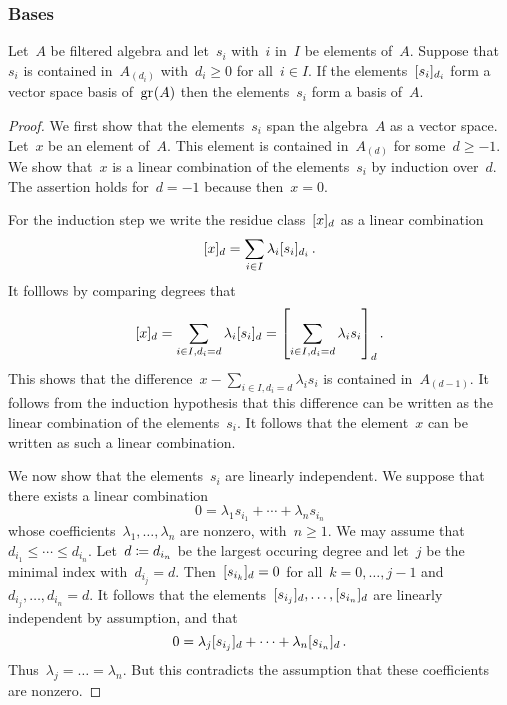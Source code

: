 \subsubsection{Bases}

\begin{proposition}
  \label{checking basis via associated graded}
  Let~$A$ be filtered algebra and let~$s_i$ with~$i$ in~$I$ be elements of~$A$.
  Suppose that~$s_i$ is contained in~$A_{(d_i)}$ with~$d_i \geq 0$ for all~$i \in I$.
  If the elements~$\lbrack s_i \rbrack_{d_i}$ form a vector space basis of~$\gr(A)$ then the elements~$s_i$ form a basis of~$A$.
\end{proposition}


\begin{proof}
  We first show that the elements~$s_i$ span the algebra~$A$ as a vector space.
  Let~$x$ be an element of~$A$.
  This element is contained in~$A_{(d)}$ for some~$d \geq -1$.
  We show that~$x$ is a linear combination of the elements~$s_i$ by induction over~$d$.
  The assertion holds for~$d = -1$ because then~$x = 0$.

  For the induction step we write the residue class~$\lbrack x \rbrack_d$ as a linear combination
  \[
    \lbrack x \rbrack_d
    =
    \sum_{i \in I}
    \lambda_i \lbrack s_i \rbrack_{d_i} \,.
  \]
  It folllows by comparing degrees that
  \[
    \fclass{ x }_d
    =
    \sum_{i \in I, d_i = d}
    \lambda_i \fclass{ s_i }_d
    =
    \fclass*{
      \sum_{i \in I, d_i = d}
      \lambda_i s_i
    }_d \,.
  \]
  This shows that the difference~$x - \sum_{i \in I, d_i = d} \lambda_i s_i$ is contained in~$A_{(d-1)}$.
  It follows from the induction hypothesis that this difference can be written as the linear combination of the elements~$s_i$.
  It follows that the element~$x$ can be written as such a linear combination.

  We now show that the elements~$s_i$ are linearly independent.
  We suppose that there exists a linear combination
  \[
    0
    =
    \lambda_1 s_{i_1} + \dotsb + \lambda_n s_{i_n}
  \]
  whose coefficients~$\lambda_1, \dotsc, \lambda_n$ are nonzero, with~$n \geq 1$.
  We may assume that~$d_{i_1} \leq \dotsb \leq d_{i_n}$.
  Let~$d \coloneqq d_{i_n}$ be the largest occuring degree and let~$j$ be the minimal index with~$d_{i_j} = d$.
  Then~$\lbrack s_{i_k} \rbrack_d = 0$ for all~$k = 0, \dotsc, j-1$ and~$d_{i_j}, \dotsc, d_{i_n} = d$.
  It follows that the elements~$\lbrack s_{i_j} \rbrack_d, \dotsc, \lbrack s_{i_n} \rbrack_d$ are linearly independent by assumption, and that
  \[
    0
    =
    \lambda_j \lbrack s_{i_j} \rbrack_d + \dotsb + \lambda_n \lbrack s_{i_n} \rbrack_d \,.
  \]
  Thus~$\lambda_j = \dotsc = \lambda_n$.
  But this contradicts the assumption that these coefficients are nonzero.
\end{proof}





